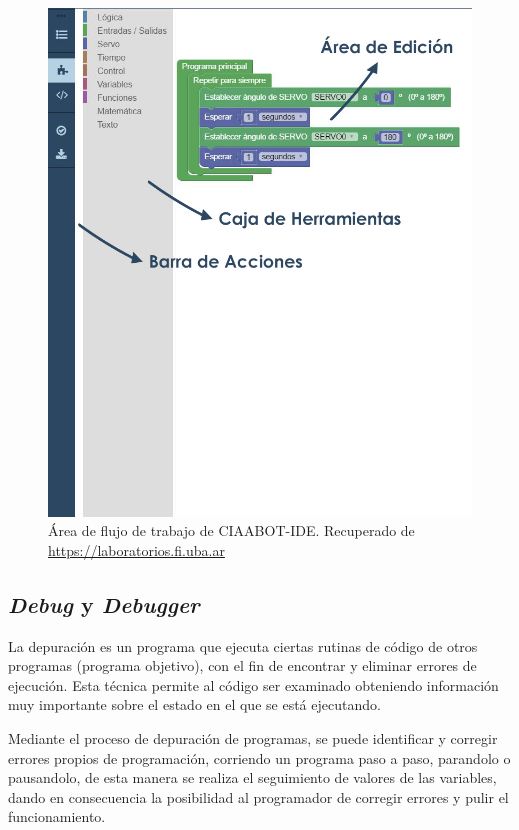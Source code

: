 \begin{figure}[h]
	\centering
	\includegraphics[scale=.50]{./Figures/editor.jpg}
	\caption{Área de flujo de trabajo de CIAABOT-IDE. Recuperado de \url{https://laboratorios.fi.uba.ar}}
	\label{fig:editor}
\end{figure}

\subsection{\emph{Debug} y \emph{Debugger}}
\label{Debug y Debugger}

La depuración es un programa que ejecuta ciertas rutinas de código de otros programas (programa objetivo), con el fin de encontrar y eliminar errores de ejecución. Esta técnica permite al código ser examinado obteniendo información muy importante sobre el estado en el que se está ejecutando.

Mediante el proceso de depuración de programas, se puede identificar y corregir errores propios de programación, corriendo un programa paso a paso, parandolo o pausandolo, de esta manera se realiza el seguimiento de
valores de las variables, dando en consecuencia la posibilidad al programador
de corregir errores y pulir el funcionamiento.

